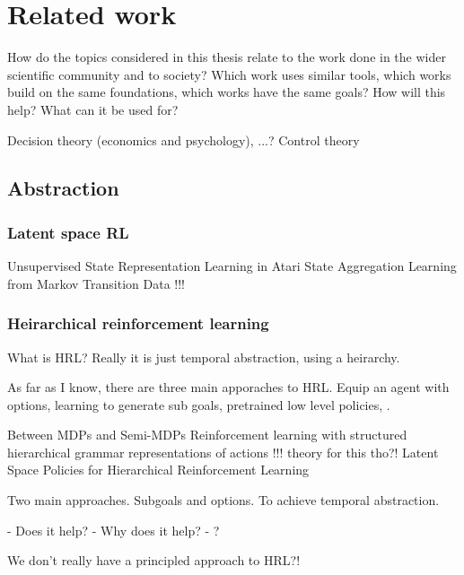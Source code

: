 \chapter{Related work}

How do the topics considered in this thesis relate to the work done in the wider scientific community and to society? Which work uses similar tools, which works build on the same foundations, which works have the same goals? How will this help? What can it be used for?

Decision theory (economics and psychology), ...?
Control theory


\section{Abstraction}

\subsection{Latent space RL}

Unsupervised State Representation Learning in Atari  \cite{Anand2019}
State Aggregation Learning from Markov Transition Data  !!!\cite{Duan2018}


\subsection{Heirarchical reinforcement learning}

What is HRL? Really it is just temporal abstraction, using a heirarchy.

As far as I know, there are three main apporaches to HRL.
Equip an agent with options, learning to generate sub goals, pretrained low level policies, .


Between MDPs and Semi-MDPs \cite{RichardS.SuttonaDoinaPrecupb1998}
Reinforcement learning with structured hierarchical grammar representations of actions  \cite{Christodoulou2019}  !!! theory for this tho?!
Latent Space Policies for Hierarchical Reinforcement Learning \cite{Haarnoja}

Two main approaches. Subgoals and options. To achieve temporal abstraction.

- Does it help?
- Why does it help?
- ?

We don't really have a principled approach to HRL?!

